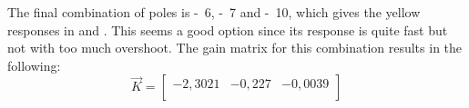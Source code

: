 \begin{minipage}{\linewidth}
\begin{minipage}{0.45\linewidth}
\begin{figure}[H]
			\centering
			\captionsetup{justification=centering}
			\label{catchingStateSpace}
		\end{figure}
	\end{minipage}
\end{minipage}

The final combination of poles is \si{-6}, \si{-7} and \si{-10}, which gives the yellow responses in  and . This seems a good option since its response is quite fast but not with too much overshoot. The gain matrix for this combination results in the following:
%
\begin{equation}  \label{controllerSS}
	\vec{K} = 
	\begin{bmatrix}
		-2,3021 & -0,227 & -0,0039 \\
	\end{bmatrix}
\end{equation}
%
